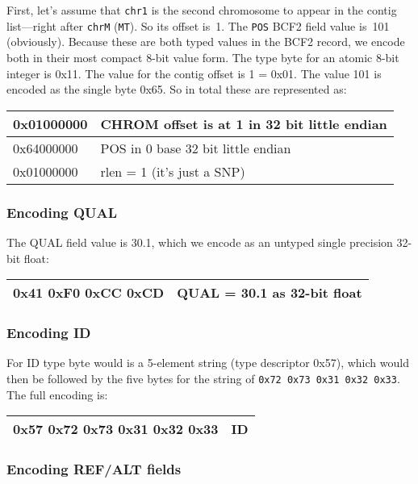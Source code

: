 \documentclass[8pt]{article}
\begin{document}
First, let's assume that {\tt chr1} is the second chromosome to appear in the
contig list---right after {\tt chrM} ({\tt MT}).  So its offset is~1.
The {\tt POS} BCF2 field value is~101 (obviously).  Because these are both
typed values in the BCF2 record, we encode both in their most compact 8-bit
value form.  The type byte for an atomic 8-bit integer is 0x11.  The value for
the contig offset is 1 = 0x01.  The value 101 is encoded as the single byte
0x65.  So in total these are represented as:

\vspace{0.3cm}
\begin{tabular}{|l | l|} \hline
0x01000000 & CHROM offset is at 1 in 32 bit little endian \\ \hline
0x64000000 & POS in 0 base 32 bit little endian \\ \hline
0x01000000 & rlen = 1 (it's just a SNP) \\ \hline
\end{tabular}

\subsubsection{Encoding QUAL}

The QUAL field value is 30.1, which we encode as an untyped single precision
32-bit float:

\vspace{0.3cm}
\begin{tabular}{|l| l|} \hline
0x41 0xF0 0xCC 0xCD & QUAL = 30.1 as 32-bit float \\ \hline
\end{tabular}

\subsubsection{Encoding ID}

For ID type byte would is a 5-element string (type descriptor 0x57),
which would then be followed by the five bytes for the string of
{\tt 0x72 0x73 0x31 0x32 0x33}.  The full encoding is:

\vspace{0.3cm}
\begin{tabular}{|l| l|} \hline
0x57 0x72 0x73 0x31 0x32 0x33 & ID \\ \hline
\end{tabular}

\subsubsection{Encoding REF/ALT fields}
\end{document}
